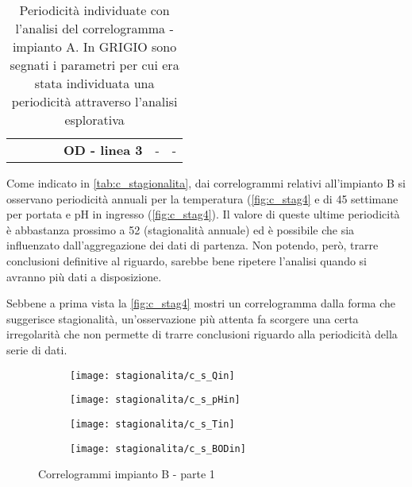\begin{table}[H]
\begin{center}
\begin{tabular}{lccllcc}
		& \multicolumn{1}{l}{}                                                                          & \multicolumn{1}{l}{}                                                                            & \multicolumn{1}{l|}{} & \multicolumn{1}{l|}{\textbf{OD - linea 3}}     & \multicolumn{1}{c|}{-}                                                                       & \multicolumn{1}{c|}{-}                                                                          \\ \cline{5-7} 
	\end{tabular}
\caption{Periodicità individuate con l'analisi del correlogramma - impianto A. In GRIGIO sono segnati i parametri per cui era stata individuata una periodicità attraverso l'analisi esplorativa}
\label{tab:sa_stagionalita}
\end{center}
\end{table}

Come indicato in \autoref{tab:c_stagionalita}, dai correlogrammi relativi all'impianto B si osservano periodicità annuali per la temperatura (\autoref{fig:c_stag4} e di 45 settimane per portata e pH in ingresso (\autoref{fig:c_stag4}). Il valore di queste ultime periodicità è abbastanza prossimo a 52 (stagionalità annuale) ed è possibile che sia influenzato dall'aggregazione dei dati di partenza. Non potendo, però, trarre conclusioni definitive al riguardo, sarebbe bene ripetere l'analisi quando si avranno più dati a disposizione.

Sebbene a prima vista la \autoref{fig:c_stag4} mostri un correlogramma dalla forma che suggerisce stagionalità, un'osservazione più attenta fa scorgere una certa irregolarità che non permette di trarre conclusioni riguardo alla periodicità della serie di dati.

\begin{sidewaysfigure}[h]
	\renewcommand*\thesubfigure{(\arabic{subfigure})}
	\begin{subfigure}{0.49\textwidth}
		\texttt{[image: stagionalita/c\_s\_Qin]}
		\caption{}
		\label{fig:c_s_Qin}
		\centering
	\end{subfigure}
	\begin{subfigure}{0.49\textwidth}
		\texttt{[image: stagionalita/c\_s\_pHin]}
		\caption{}
		\label{fig:c_s_pHin}
		\centering
	\end{subfigure}

	\begin{subfigure}{0.49\textwidth}
		\texttt{[image: stagionalita/c\_s\_Tin]}
		\caption{}
		\label{fig:c_s_Tin}
		\centering
	\end{subfigure}
	\begin{subfigure}{0.49\textwidth}
		\texttt{[image: stagionalita/c\_s\_BODin]}	
		\caption{}
		\centering
	\end{subfigure}
	\caption{Correlogrammi impianto B - parte 1}
\end{sidewaysfigure}

